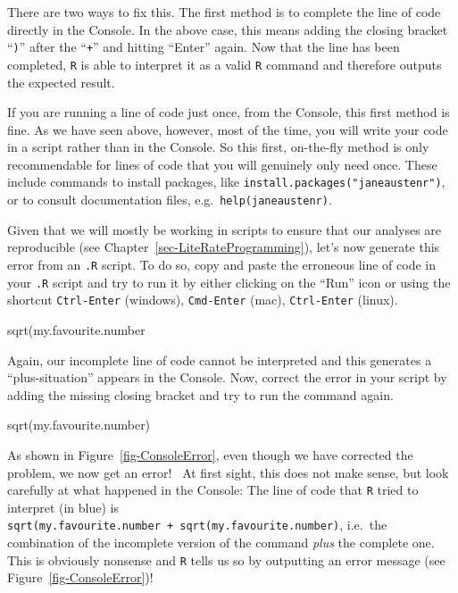 \documentclass[
  letterpaper,
  DIV=11,
  numbers=noendperiod]{scrreprt}
\newenvironment{Shaded}{\begin{snugshade}}{\end{snugshade}}
\newcommand{\FunctionTok}[1]{\textcolor[rgb]{0.28,0.35,0.67}{#1}}
\newcommand{\NormalTok}[1]{\textcolor[rgb]{0.00,0.23,0.31}{#1}}
\begin{document}
There are two ways to fix this. The first method is to complete the line
of code directly in the Console. In the above case, this means adding
the closing bracket ``\texttt{)}'' after the ``\texttt{+}'' and hitting
``Enter'' again. Now that the line has been completed, \texttt{R} is
able to interpret it as a valid \texttt{R} command and therefore outputs
the expected result.

If you are running a line of code just once, from the Console, this
first method is fine. As we have seen above, however, most of the time,
you will write your code in a script rather than in the Console. So this
first, on-the-fly method is only recommendable for lines of code that
you will genuinely only need once. These include commands to install
packages, like \texttt{install.packages("janeaustenr")}, or to consult
documentation files, e.g.~\texttt{help(janeaustenr)}.

Given that we will mostly be working in scripts to ensure that our
analyses are reproducible (see Chapter~\ref{sec-LiteRateProgramming}),
let's now generate this error from an \texttt{.R} script. To do so, copy
and paste the erroneous line of code in your \texttt{.R} script and try
to run it by either clicking on the ``Run'' icon or using the shortcut
\texttt{Ctrl-Enter} (windows), \texttt{Cmd-Enter} (mac), \texttt{Ctrl-Enter} (linux).

\begin{Shaded}
\begin{Highlighting}[]
\FunctionTok{sqrt}\NormalTok{(my.favourite.number}
\end{Highlighting}
\end{Shaded}

Again, our incomplete line of code cannot be interpreted and this
generates a ``plus-situation'' appears in the Console. Now, correct the
error in your script by adding the missing closing bracket and try to
run the command again.

\begin{Shaded}
\begin{Highlighting}[]
\FunctionTok{sqrt}\NormalTok{(my.favourite.number)}
\end{Highlighting}
\end{Shaded}

As shown in Figure~\ref{fig-ConsoleError}, even though we have corrected
the problem, we now get an error!~ At first sight,
this does not make sense, but look carefully at what happened in the
Console: The line of code that \texttt{R} tried to interpret (in blue)
is \texttt{sqrt(my.favourite.number\ +\ sqrt(my.favourite.number)},
i.e.~the combination of the incomplete version of the command
\emph{plus} the complete one. This is obviously nonsense and \texttt{R}
tells us so by outputting an error message (see
Figure~\ref{fig-ConsoleError})!
\end{document}
